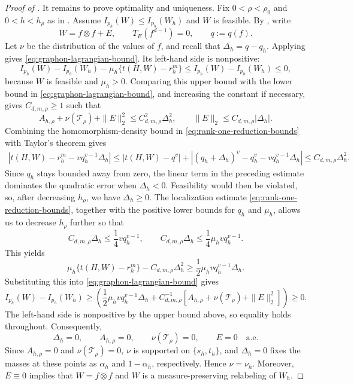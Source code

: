 \begin{proof}[Proof of ]
It remains to prove optimality and uniqueness.
Fix $0<\rho<\rho_0$ and $0<h<h_\rho$ as in .
Assume $I_{p_h}(W)\le I_{p_h}(W_h)$ and $W$ is feasible.
By , write
\[
  W=f\otimes f+E,
  \qquad
  T_E(f^{d-1})=0,
  \qquad
  q:=q(f).
\]
Let $\nu$ be the distribution of the values of $f$, and recall that
$\Delta_h=q-q_h$.  Applying  gives
\eqref{eq:graphon-lagrangian-bound}.  Its left-hand side is nonpositive:
\[
  I_{p_h}(W)-I_{p_h}(W_h)-\mu_h\{t(H,W)-r_h^m\}
  \le I_{p_h}(W)-I_{p_h}(W_h)\le0,
\]
because $W$ is feasible and $\mu_h>0$.  Comparing this upper bound with the
lower bound in \eqref{eq:graphon-lagrangian-bound}, and increasing the
constant if necessary, gives $C_{d,m,\rho}\ge1$ such that
\[
  A_{h,\rho}+\nu(\mathcal T_\rho)+\|E\|_2^2
  \le C_{d,m,\rho}^2\Delta_h^2,
  \qquad
  \|E\|_2\le C_{d,m,\rho}|\Delta_h|.
\]
Combining the homomorphism-density bound in
\eqref{eq:rank-one-reduction-bounds} with Taylor's theorem gives
\begin{equation*}
\begin{aligned}
  \left|t(H,W)-r_h^m-vq_h^{v-1}\Delta_h\right|
  \le 
  |t(H,W)-q^v|
    +\left|(q_h+\Delta_h)^v-q_h^v
      -vq_h^{v-1}\Delta_h\right|
  \le C_{d,m,\rho}\Delta_h^2.
\end{aligned}
\end{equation*}
Since $q_h$ stays bounded away from zero, the linear term in the preceding
estimate dominates the quadratic error when $\Delta_h<0$.  Feasibility
would then be violated, so, after decreasing $h_\rho$, we have
$\Delta_h\ge0$.  The localization estimate
\eqref{eq:rank-one-reduction-bounds}, together with the positive lower
bounds for $q_h$ and $\mu_h$, allows us to decrease $h_\rho$ further so that
\[
  C_{d,m,\rho}\Delta_h\le\frac14vq_h^{v-1},
  \qquad
  C_{d,m,\rho}\Delta_h\le\frac14\mu_hvq_h^{v-1}.
\]
This yields
\begin{equation*}
  \mu_h\{t(H,W)-r_h^m\}-C_{d,m,\rho}\Delta_h^2
  \ge\frac12\mu_hvq_h^{v-1}\Delta_h.
\end{equation*}
Substituting this into \eqref{eq:graphon-lagrangian-bound} gives
\begin{equation*}
  I_{p_h}(W)-I_{p_h}(W_h)
  \ge
  \left(\frac12\mu_hvq_h^{v-1}\Delta_h
    +C_{d,m,\rho}^{-1}
    \left[A_{h,\rho}+\nu(\mathcal T_\rho)+\|E\|_2^2\right]\right)
  \ge0.
\end{equation*}
The left-hand side is nonpositive by the upper bound above, so equality holds
throughout.  Consequently,
\begin{equation*}
  \Delta_h=0,
  \qquad A_{h,\rho}=0,
  \qquad \nu(\mathcal T_\rho)=0,
  \qquad E=0\quad\text{a.e.}
\end{equation*}
Since $A_{h,\rho}=0$ and $\nu(\mathcal T_\rho)=0$,
$\nu$ is supported on $\{s_h,t_h\}$, and $\Delta_h=0$ fixes the masses at
these points as $\alpha_h$ and $1-\alpha_h$, respectively.  Hence $\nu=\nu_h$.
Moreover, $E\equiv0$ implies that $W=f\otimes f$ and $W$ is a measure-preserving relabeling of $W_h$.
\end{proof}

